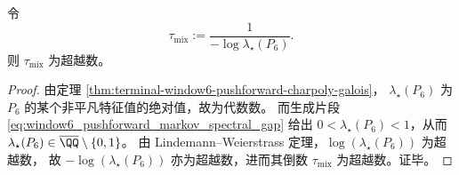 \begin{theorem}\label{thm:terminal-window6-mixing-time-transcendence}
令
\[
\tau_{\mathrm{mix}}:=\frac{1}{-\log \lambda_{\star}(P_6)}.
\]
则 \(\tau_{\mathrm{mix}}\) 为超越数。
\end{theorem}
\begin{proof}
由定理 \ref{thm:terminal-window6-pushforward-charpoly-galois}，
\(\lambda_{\star}(P_6)\) 为 \(P_6\) 的某个非平凡特征值的绝对值，故为代数数。
而生成片段 \eqref{eq:window6_pushforward_markov_spectral_gap} 给出
\(
0<\lambda_{\star}(P_6)<1
\)，从而 \(\lambda_{\star}(P_6)\in\overline{\QQ}\setminus\{0,1\}\)。
由 Lindemann--Weierstrass 定理，\(\log(\lambda_{\star}(P_6))\) 为超越数，
故 \(-\log(\lambda_{\star}(P_6))\) 亦为超越数，进而其倒数 \(\tau_{\mathrm{mix}}\) 为超越数。证毕。
\end{proof}
